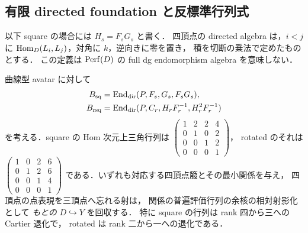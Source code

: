 \subsection{有限 directed foundation と反標準行列式}

以下 square の場合には $H_s=F_sG_s$ と書く．
四頂点の directed algebra は，$i<j$ に
$\operatorname{Hom}_D(L_i,L_j)$，対角に $k$，逆向きに零を置き，
積を切断の乗法で定めたものとする．
この定義は $\operatorname{Perf}(D)$ の full dg endomorphism algebra
を意味しない．

\begin{proposition}
\label{prop:qa-core-directed-foundations}
曲線型 avatar に対して
\[
\begin{aligned}
B_{\mathrm{sq}}&=\operatorname{End}_{\mathrm{dir}}(P,F_s,G_s,F_sG_s),\\
B_{\mathrm{rsq}}&=\operatorname{End}_{\mathrm{dir}}
 (P,C_r,H_rF_r^{-1},H_r^2F_r^{-1})
\end{aligned}
\]
を考える．square の Hom 次元上三角行列は
$\left(\begin{smallmatrix}
1&2&2&4\\0&1&0&2\\0&0&1&2\\0&0&0&1
\end{smallmatrix}\right)$，
rotated のそれは
$\left(\begin{smallmatrix}
1&0&2&6\\0&1&2&6\\0&0&1&4\\0&0&0&1
\end{smallmatrix}\right)$
である．いずれも対応する四頂点箙とその最小関係を与え，
四頂点の点表現を三頂点へ忘れる射は，
関係の普遍評価行列の余核の相対射影化として
\emph{もとの} $D\hookrightarrow Y$ を回収する．
特に square の行列は rank 四から三への Cartier 退化で，
rotated は rank 二から一への退化である．
\end{proposition}
